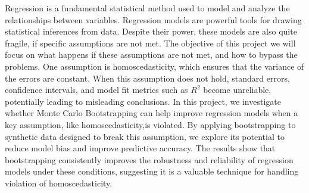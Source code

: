 Regression is a fundamental statistical method used to model and analyze the relationships between variables. Regression models are powerful tools for drawing statistical inferences from data. Despite their power, these models are also quite fragile, if specific assumptions are not met. The objective of this project we will focus on what happens if these assumptions are not met, and how to bypass the problems. One assumption is homoscedasticity, which ensures that the variance of the errors are constant. When this assumption does not hold, standard errors, confidence intervals, and model fit metrics such as $R^2$ become unreliable, potentially leading to misleading conclusions. In this project, we investigate whether Monte Carlo Bootstrapping can help improve regression models when a key assumption, like homoscedasticity,is violated. By applying bootstrapping to synthetic data designed to break this assumption, we explore its potential to reduce model bias and improve predictive accuracy. The results show that bootstrapping consistently improves the robustness and reliability of regression models under these conditions, suggesting it is a valuable technique for handling  violation of homoscedasticity.